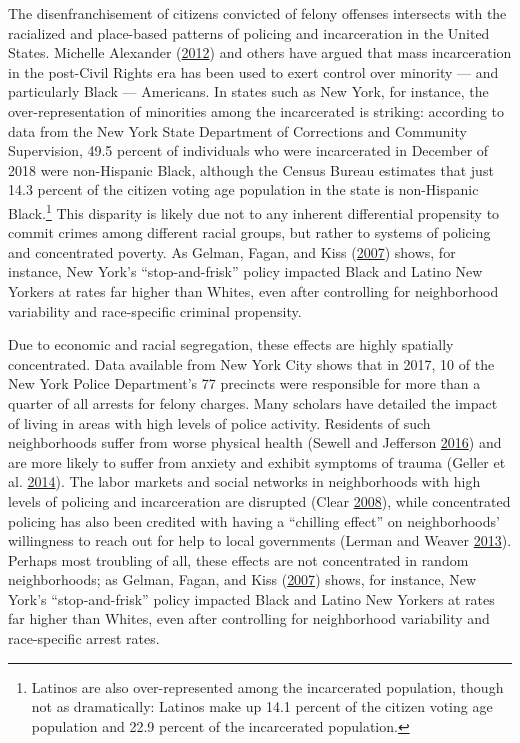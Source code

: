 \documentclass[12pt,]{article}
\let\rmarkdownfootnote\footnote%
\def\footnote{\protect\rmarkdownfootnote}
\begin{document}
The disenfranchisement of citizens convicted of felony offenses intersects with the racialized and place-based patterns of policing and incarceration in the United States. Michelle Alexander (\protect\hyperlink{ref-Alexander2012}{2012}) and others have argued that mass incarceration in the post-Civil Rights era has been used to exert control over minority --- and particularly Black --- Americans. In states such as New York, for instance, the over-representation of minorities among the incarcerated is striking: according to data from the New York State Department of Corrections and Community Supervision, 49.5 percent of individuals who were incarcerated in December of 2018 were non-Hispanic Black, although the Census Bureau estimates that just 14.3 percent of the citizen voting age population in the state is non-Hispanic Black.\footnote{Latinos are also over-represented among the incarcerated population, though not as dramatically: Latinos make up 14.1 percent of the citizen voting age population and 22.9 percent of the incarcerated population.} This disparity is likely due not to any inherent differential propensity to commit crimes among different racial groups, but rather to systems of policing and concentrated poverty. As Gelman, Fagan, and Kiss (\protect\hyperlink{ref-Gelman2007}{2007}) shows, for instance, New York's ``stop-and-frisk'' policy impacted Black and Latino New Yorkers at rates far higher than Whites, even after controlling for neighborhood variability and race-specific criminal propensity.

Due to economic and racial segregation, these effects are highly spatially concentrated. Data available from New York City shows that in 2017, 10 of the New York Police Department's 77 precincts were responsible for more than a quarter of all arrests for felony charges. Many scholars have detailed the impact of living in areas with high levels of police activity. Residents of such neighborhoods suffer from worse physical health (Sewell and Jefferson \protect\hyperlink{ref-Sewell2016}{2016}) and are more likely to suffer from anxiety and exhibit symptoms of trauma (Geller et al. \protect\hyperlink{ref-Geller2014}{2014}). The labor markets and social networks in neighborhoods with high levels of policing and incarceration are disrupted (Clear \protect\hyperlink{ref-Clear2008}{2008}), while concentrated policing has also been credited with having a ``chilling effect'' on neighborhoods' willingness to reach out for help to local governments (Lerman and Weaver \protect\hyperlink{ref-Lerman2013}{2013}). Perhaps most troubling of all, these effects are not concentrated in random neighborhoods; as Gelman, Fagan, and Kiss (\protect\hyperlink{ref-Gelman2007}{2007}) shows, for instance, New York's ``stop-and-frisk'' policy impacted Black and Latino New Yorkers at rates far higher than Whites, even after controlling for neighborhood variability and race-specific arrest rates.
\end{document}
